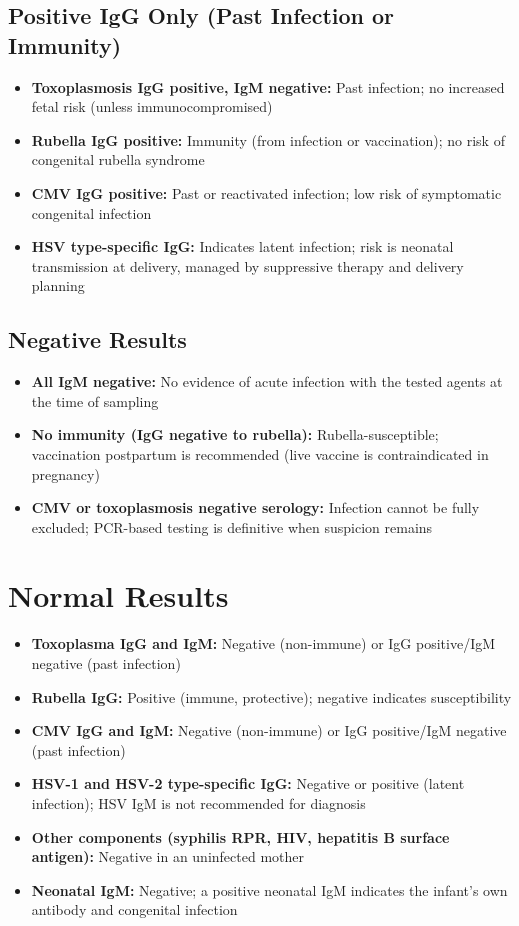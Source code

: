 \subsection*{Positive IgG Only (Past Infection or Immunity)}
\begin{itemize}
  \item \textbf{Toxoplasmosis IgG positive, IgM negative:} Past infection; no increased fetal risk (unless immunocompromised)
  \item \textbf{Rubella IgG positive:} Immunity (from infection or vaccination); no risk of congenital rubella syndrome
  \item \textbf{CMV IgG positive:} Past or reactivated infection; low risk of symptomatic congenital infection
  \item \textbf{HSV type-specific IgG:} Indicates latent infection; risk is neonatal transmission at delivery, managed by suppressive therapy and delivery planning
\end{itemize}

\subsection*{Negative Results}
\begin{itemize}
  \item \textbf{All IgM negative:} No evidence of acute infection with the tested agents at the time of sampling
  \item \textbf{No immunity (IgG negative to rubella):} Rubella-susceptible; vaccination postpartum is recommended (live vaccine is contraindicated in pregnancy)
  \item \textbf{CMV or toxoplasmosis negative serology:} Infection cannot be fully excluded; PCR-based testing is definitive when suspicion remains
\end{itemize}

\section*{Normal Results}
\begin{itemize}
  \item \textbf{Toxoplasma IgG and IgM:} Negative (non-immune) or IgG positive/IgM negative (past infection)
  \item \textbf{Rubella IgG:} Positive (immune, protective); negative indicates susceptibility
  \item \textbf{CMV IgG and IgM:} Negative (non-immune) or IgG positive/IgM negative (past infection)
  \item \textbf{HSV-1 and HSV-2 type-specific IgG:} Negative or positive (latent infection); HSV IgM is not recommended for diagnosis
  \item \textbf{Other components (syphilis RPR, HIV, hepatitis B surface antigen):} Negative in an uninfected mother
  \item \textbf{Neonatal IgM:} Negative; a positive neonatal IgM indicates the infant's own antibody and congenital infection
\end{itemize}

